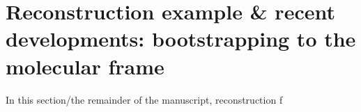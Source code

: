 \section{Reconstruction example & recent developments: bootstrapping to the molecular frame}

In this section/the remainder of the manuscript, reconstruction f